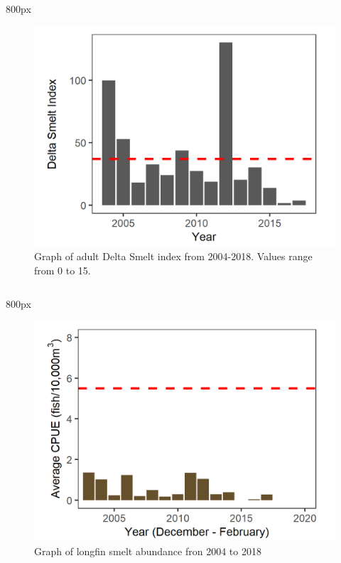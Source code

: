 \documentclass[
]{book}
\begin{document}
\begin{column}{800px\textwidth}
\begin{figure}
\includegraphics[width=15.25in]{figures/skt_dsm_fig_meanline} \caption{Graph of adult Delta Smelt index from 2004-2018. Values range from 0 to 15.}\label{fig:unnamed-chunk-182}
\end{figure}
\end{column}

\begin{column}{800px\textwidth}
\begin{figure}
\includegraphics[width=15.25in]{figures/lonsme_plot_recent} \caption{Graph of longfin smelt abundance fron 2004 to 2018}\label{fig:unnamed-chunk-183}
\end{figure}
\end{column}
\end{document}

